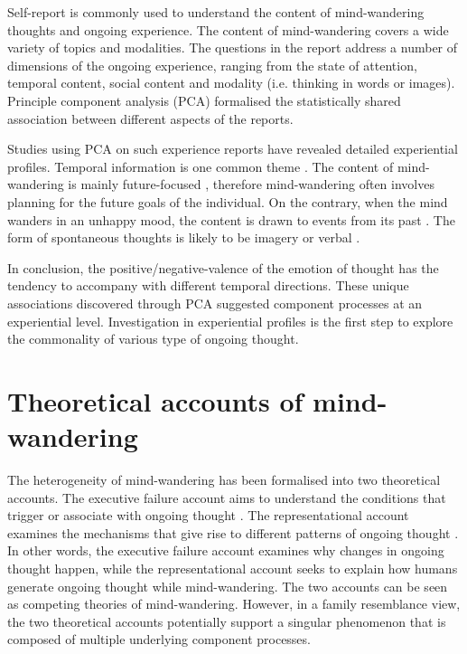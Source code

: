 Self-report is commonly used to understand the content of mind-wandering thoughts and ongoing experience. The content of mind-wandering covers a wide variety of topics and modalities. The questions in the report address a number of dimensions of the ongoing experience, ranging from the state of attention, temporal content, social content and modality (i.e. thinking in words or images). Principle component analysis (PCA) formalised the statistically shared association between different aspects of the reports. 

Studies using PCA on such experience reports have revealed detailed experiential profiles. Temporal information is one common theme \cite{RubyFP2013,RubyPlos2013}. The content of mind-wandering is mainly future-focused \cite{Baird2011}, therefore mind-wandering often involves planning for the future goals of the individual. On the contrary, when the mind wanders in an unhappy mood, the content is drawn to events from its past \cite{Smallwood2011}. The form of spontaneous thoughts is likely to be imagery or verbal \cite{Gorgolewski2014,Smallwood2016}. 

In conclusion, the positive/negative-valence of the emotion of thought has the tendency to accompany with different temporal directions. These unique associations discovered through PCA suggested component processes at an experiential level. Investigation in experiential profiles is the first step to explore the commonality of various type of ongoing thought. 


\section{Theoretical accounts of mind-wandering}
\label{ch:intro:accounts}

The heterogeneity of mind-wandering has been formalised into two theoretical accounts. The executive failure account aims to understand the conditions that trigger or associate with ongoing thought \cite{Kane2012,McVay2010}. The representational account examines the mechanisms that give rise to different patterns of ongoing thought \cite{Smallwood2016}. In other words, the executive failure account examines why changes in ongoing thought happen, while the representational account seeks to explain how humans generate ongoing thought while mind-wandering. The two accounts can be seen as competing theories of mind-wandering. However, in a family resemblance view, the two theoretical accounts potentially support a singular phenomenon that is composed of multiple underlying component processes. 

